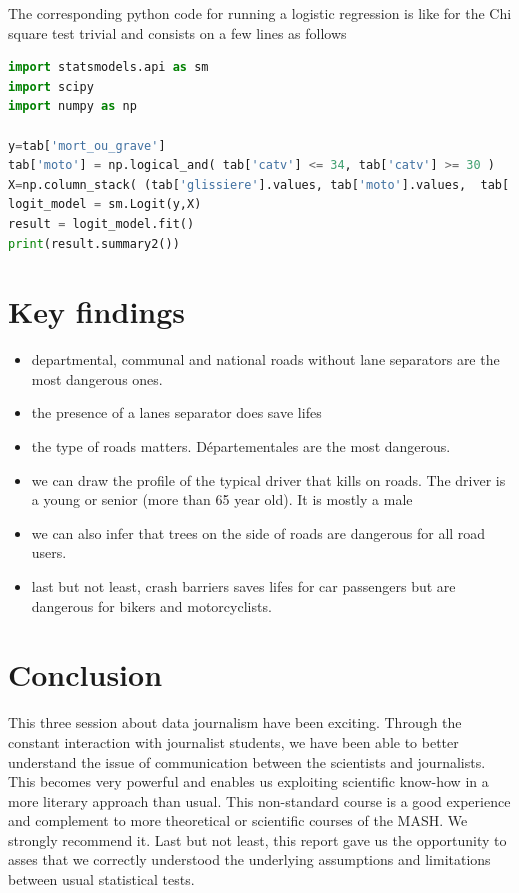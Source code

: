 \documentclass[a4paper]{article}
\theoremstyle{definition}
\theoremstyle{proposition}
\begin{document}
The corresponding python code for running a logistic regression is like for the Chi square test trivial and consists on a few lines as follows

\begin{lstlisting}[language=Python]
import statsmodels.api as sm
import scipy 
import numpy as np

y=tab['mort_ou_grave']
tab['moto'] = np.logical_and( tab['catv'] <= 34, tab['catv'] >= 30 )
X=np.column_stack( (tab['glissiere'].values, tab['moto'].values,  tab['moto'].values * tab['glissiere'].values) )
logit_model = sm.Logit(y,X)
result = logit_model.fit()
print(result.summary2())
\end{lstlisting}

\section{Key findings}
\begin{itemize}
\item departmental, communal and national roads without lane separators are the most dangerous ones.
\item the presence of a lanes separator does save lifes
\item the type of roads matters. Départementales are the most dangerous.
\item we can draw the profile of the typical driver that kills on roads. The driver is a young or senior (more than 65 year old). It is mostly a male
\item we can also infer that trees on the side of roads are dangerous for all road users.
\item last but not least, crash barriers saves lifes for car passengers but are dangerous for bikers and motorcyclists.
\end{itemize}

\section{Conclusion}
This three session about data journalism have been exciting. Through the constant interaction with journalist students, we have been able to better understand the issue of communication between the scientists and journalists. This becomes very powerful and enables us exploiting scientific know-how in a more literary approach than usual. This non-standard course is a good experience and complement to more theoretical or scientific courses of the MASH. We strongly recommend it.
Last but not least, this report gave us the opportunity to asses that we correctly understood the underlying assumptions and limitations between usual statistical tests.
\end{document}
